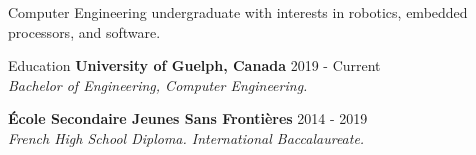\documentclass{resume}
\begin{document}
    \begin{rSection}{}
        \begin{center}
            Computer Engineering undergraduate with interests in robotics, embedded processors, and software.
        \end{center}

    \end{rSection}

    \begin{rSection}{Education}
        \textbf{University of Guelph, Canada}
        \hfill{2019 - Current} \\ 
        {\em Bachelor of Engineering, Computer Engineering.}
        \hfill{}

        \textbf{École Secondaire Jeunes Sans Frontières}
        \hfill {2014 - 2019} \\ 
        {\em French High School Diploma. International Baccalaureate.}
        \hfill {}
    \end{rSection}
\end{document}
